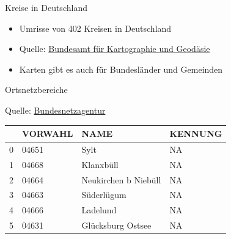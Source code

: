 \begin{frame}[fragile]{Kreise in Deutschland}

\begin{itemize}
\tightlist
\item
  Umrisse von 402 Kreisen in Deutschland
\item
  Quelle:
  \href{http://www.geodatenzentrum.de/geodaten/gdz_rahmen.gdz_div?gdz_spr=deu\&gdz_akt_zeile=5\&gdz_anz_zeile=1\&gdz_unt_zeile=15\&gdz_user_id=0}{Bundesamt
  für Kartographie und Geodäsie}
\item
  Karten gibt es auch für Bundesländer und Gemeinden
\end{itemize}

\begin{Shaded}
\begin{Highlighting}[]
\StringTok{ }\NormalTok{(}\NormalTok{)}
\end{Highlighting}
\end{Shaded}

\end{frame}

\begin{frame}[fragile]{Ortsnetzbereiche}

Quelle:
\href{https://www.bundesnetzagentur.de/DE/Sachgebiete/Telekommunikation/Unternehmen_Institutionen/Nummerierung/Rufnummern/ONRufnr/ON_Einteilung_ONB/ON_ONB_ONKz_ONBGrenzen_Basepage.html}{Bundesnetzagentur}

\begin{longtable}[]{@{}llll@{}}
\toprule
& VORWAHL & NAME & KENNUNG\tabularnewline
\midrule
\endhead
0 & 04651 & Sylt & NA\tabularnewline
1 & 04668 & Klanxbüll & NA\tabularnewline
2 & 04664 & Neukirchen b Niebüll & NA\tabularnewline
3 & 04663 & Süderlügum & NA\tabularnewline
4 & 04666 & Ladelund & NA\tabularnewline
5 & 04631 & Glücksburg Ostsee & NA\tabularnewline
\bottomrule
\end{longtable}

\begin{Shaded}
\begin{Highlighting}[]
\StringTok{ }\NormalTok{(}\NormalTok{)}
\NormalTok{(}
\end{Highlighting}
\end{Shaded}

\end{frame}

